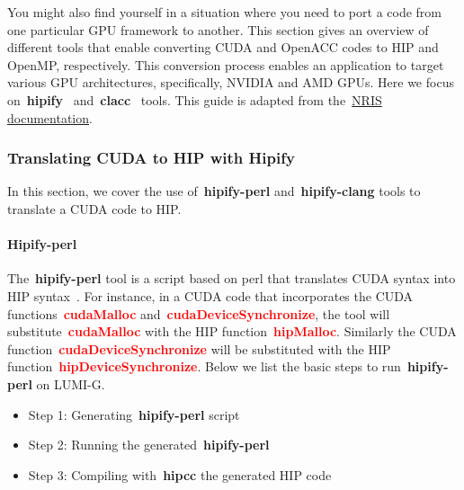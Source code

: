 \par
You might also find yourself in a situation where you need to port a code from one particular GPU framework to another.
This section gives an overview of different tools that enable converting CUDA and OpenACC codes to HIP and OpenMP, respectively.
This conversion process enables an application to target various GPU architectures, specifically, NVIDIA and AMD GPUs. 
Here we focus on~\textbf{hipify}~\cite{hipify} and~\textbf{clacc}~\cite{clacc} tools.
This guide is adapted from the~\href{https://documentation.sigma2.no/code_development/guides/cuda_translating-tools.html}{NRIS documentation}.


\subsubsection{Translating CUDA to HIP with Hipify}


\par
In this section, we cover the use of~\textbf{hipify-perl} and~\textbf{hipify-clang} tools to translate a CUDA code to HIP.


\paragraph{Hipify-perl}


\par
The~\textbf{hipify-perl} tool is a script based on perl that translates CUDA syntax into HIP syntax~\cite{hipify}.
For instance, in a CUDA code that incorporates the CUDA functions~\textbf{\textcolor{red}{cudaMalloc}} and~\textbf{\textcolor{red}{cudaDeviceSynchronize}}, the tool will substitute~\textbf{\textcolor{red}{cudaMalloc}} with the HIP function~\textbf{\textcolor{red}{hipMalloc}}.
Similarly the CUDA function~\textbf{\textcolor{red}{cudaDeviceSynchronize}} will be substituted with the HIP function~\textbf{\textcolor{red}{hipDeviceSynchronize}}.
Below we list the basic steps to run~\textbf{hipify-perl} on LUMI-G.


\begin{itemize}
    \item Step 1: Generating~\textbf{hipify-perl} script
    
    \item Step 2: Running the generated~\textbf{hipify-perl}
    
    \item Step 3: Compiling with~\textbf{hipcc} the generated HIP code
    
\end{itemize}


